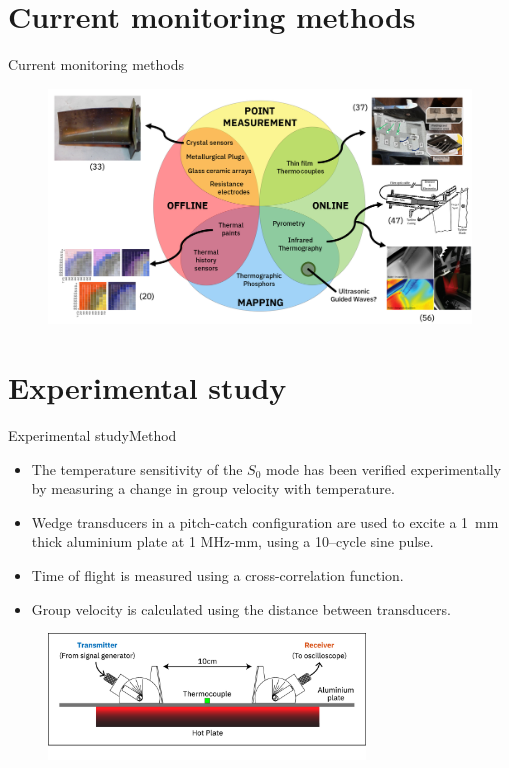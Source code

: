 \documentclass[aspectratio=169, 9pt]{beamer}
\begin{document}

\section{Current monitoring methods}
\begin{frame}{Current monitoring methods}

\begin{figure}
  \centering
  \includegraphics[width=\textwidth]{images/venndiagram.png}
\end{figure}
\end{frame}


\section{Experimental study}
\begin{frame}{Experimental study}{Method}

\begin{itemize}
  \item The temperature sensitivity of the $S_0$ mode has been verified experimentally by measuring a change in group velocity with temperature.
  \item Wedge transducers in a pitch-catch configuration are used to excite a 1~mm thick aluminium plate at 1 MHz-mm, using a 10--cycle sine pulse. 
  \item Time of flight is measured using a cross-correlation function.
  \item Group velocity is calculated using the distance between transducers.
\end{itemize}

  \begin{figure}[h]
    \centering
    \includegraphics[width=0.75\textwidth]{images/testdiagramsimple.eps}
    \end{figure}
\end{frame}
\end{document}
